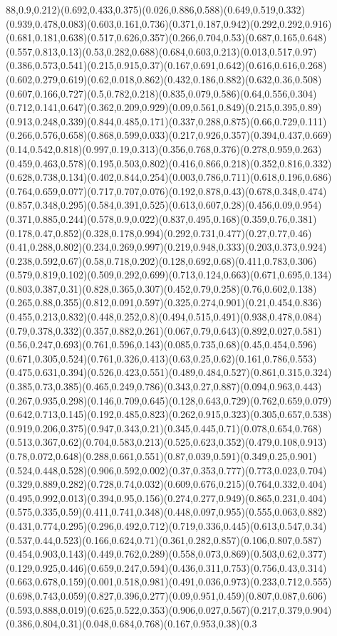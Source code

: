 {88,0.9,0.212)(0.692,0.433,0.375)(0.026,0.886,0.588)(0.649,0.519,0.332)(0.939,0.478,0.083)(0.603,0.161,0.736)(0.371,0.187,0.942)(0.292,0.292,0.916)(0.681,0.181,0.638)(0.517,0.626,0.357)(0.266,0.704,0.53)(0.687,0.165,0.648)(0.557,0.813,0.13)(0.53,0.282,0.688)(0.684,0.603,0.213)(0.013,0.517,0.97)(0.386,0.573,0.541)(0.215,0.915,0.37)(0.167,0.691,0.642)(0.616,0.616,0.268)(0.602,0.279,0.619)(0.62,0.018,0.862)(0.432,0.186,0.882)(0.632,0.36,0.508)(0.607,0.166,0.727)(0.5,0.782,0.218)(0.835,0.079,0.586)(0.64,0.556,0.304)(0.712,0.141,0.647)(0.362,0.209,0.929)(0.09,0.561,0.849)(0.215,0.395,0.89)(0.913,0.248,0.339)(0.844,0.485,0.171)(0.337,0.288,0.875)(0.66,0.729,0.111)(0.266,0.576,0.658)(0.868,0.599,0.033)(0.217,0.926,0.357)(0.394,0.437,0.669)(0.14,0.542,0.818)(0.997,0.19,0.313)(0.356,0.768,0.376)(0.278,0.959,0.263)(0.459,0.463,0.578)(0.195,0.503,0.802)(0.416,0.866,0.218)(0.352,0.816,0.332)(0.628,0.738,0.134)(0.402,0.844,0.254)(0.003,0.786,0.711)(0.618,0.196,0.686)(0.764,0.659,0.077)(0.717,0.707,0.076)(0.192,0.878,0.43)(0.678,0.348,0.474)(0.857,0.348,0.295)(0.584,0.391,0.525)(0.613,0.607,0.28)(0.456,0.09,0.954)(0.371,0.885,0.244)(0.578,0.9,0.022)(0.837,0.495,0.168)(0.359,0.76,0.381)(0.178,0.47,0.852)(0.328,0.178,0.994)(0.292,0.731,0.477)(0.27,0.77,0.46)(0.41,0.288,0.802)(0.234,0.269,0.997)(0.219,0.948,0.333)(0.203,0.373,0.924)(0.238,0.592,0.67)(0.58,0.718,0.202)(0.128,0.692,0.68)(0.411,0.783,0.306)(0.579,0.819,0.102)(0.509,0.292,0.699)(0.713,0.124,0.663)(0.671,0.695,0.134)(0.803,0.387,0.31)(0.828,0.365,0.307)(0.452,0.79,0.258)(0.76,0.602,0.138)(0.265,0.88,0.355)(0.812,0.091,0.597)(0.325,0.274,0.901)(0.21,0.454,0.836)(0.455,0.213,0.832)(0.448,0.252,0.8)(0.494,0.515,0.491)(0.938,0.478,0.084)(0.79,0.378,0.332)(0.357,0.882,0.261)(0.067,0.79,0.643)(0.892,0.027,0.581)(0.56,0.247,0.693)(0.761,0.596,0.143)(0.085,0.735,0.68)(0.45,0.454,0.596)(0.671,0.305,0.524)(0.761,0.326,0.413)(0.63,0.25,0.62)(0.161,0.786,0.553)(0.475,0.631,0.394)(0.526,0.423,0.551)(0.489,0.484,0.527)(0.861,0.315,0.324)(0.385,0.73,0.385)(0.465,0.249,0.786)(0.343,0.27,0.887)(0.094,0.963,0.443)(0.267,0.935,0.298)(0.146,0.709,0.645)(0.128,0.643,0.729)(0.762,0.659,0.079)(0.642,0.713,0.145)(0.192,0.485,0.823)(0.262,0.915,0.323)(0.305,0.657,0.538)(0.919,0.206,0.375)(0.947,0.343,0.21)(0.345,0.445,0.71)(0.078,0.654,0.768)(0.513,0.367,0.62)(0.704,0.583,0.213)(0.525,0.623,0.352)(0.479,0.108,0.913)(0.78,0.072,0.648)(0.288,0.661,0.551)(0.87,0.039,0.591)(0.349,0.25,0.901)(0.524,0.448,0.528)(0.906,0.592,0.002)(0.37,0.353,0.777)(0.773,0.023,0.704)(0.329,0.889,0.282)(0.728,0.74,0.032)(0.609,0.676,0.215)(0.764,0.332,0.404)(0.495,0.992,0.013)(0.394,0.95,0.156)(0.274,0.277,0.949)(0.865,0.231,0.404)(0.575,0.335,0.59)(0.411,0.741,0.348)(0.448,0.097,0.955)(0.555,0.063,0.882)(0.431,0.774,0.295)(0.296,0.492,0.712)(0.719,0.336,0.445)(0.613,0.547,0.34)(0.537,0.44,0.523)(0.166,0.624,0.71)(0.361,0.282,0.857)(0.106,0.807,0.587)(0.454,0.903,0.143)(0.449,0.762,0.289)(0.558,0.073,0.869)(0.503,0.62,0.377)(0.129,0.925,0.446)(0.659,0.247,0.594)(0.436,0.311,0.753)(0.756,0.43,0.314)(0.663,0.678,0.159)(0.001,0.518,0.981)(0.491,0.036,0.973)(0.233,0.712,0.555)(0.698,0.743,0.059)(0.827,0.396,0.277)(0.09,0.951,0.459)(0.807,0.087,0.606)(0.593,0.888,0.019)(0.625,0.522,0.353)(0.906,0.027,0.567)(0.217,0.379,0.904)(0.386,0.804,0.31)(0.048,0.684,0.768)(0.167,0.953,0.38)(0.3}
